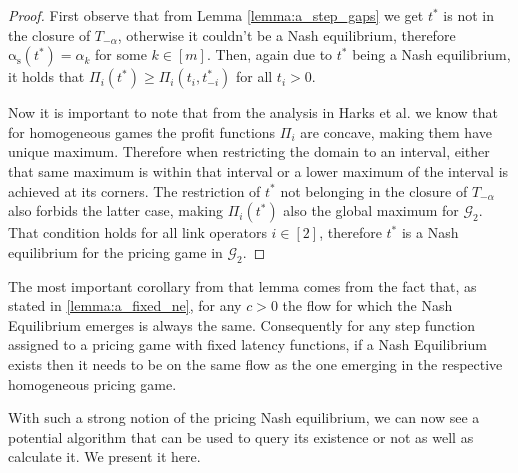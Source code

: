 \documentclass[10pt,a4paper]{book}
\newcommand{\as}{\mathrm{\alpha_s}}
\newcommand{\Gm}{\mathcal{G}}
\theoremstyle{definition}
\theoremstyle{comment}
\begin{document}
\begin{proof}
	First observe that from Lemma \ref{lemma:a_step_gaps} we get $t^*$ is not in the closure of $T_{-\alpha}$, otherwise it couldn't be a Nash equilibrium, therefore $\as(t^*) = \alpha_k$ for some $k \in [m]$.
	Then, again due to $t^*$ being a Nash equilibrium, it holds that $\Pi_i(t^*) \ge \Pi_i(t_i, t_{-i}^*)$ for all $t_i > 0$.

	Now it is important to note that from the analysis in Harks et al. \cite{Harks_2019} we know that for homogeneous games the profit functions $\Pi_i$ are concave, making them have unique maximum.
	Therefore when restricting the domain to an interval, either that same maximum is within that interval or a lower maximum of the interval is achieved at its corners.
	The restriction of $t^*$ not belonging in the closure of $T_{-\alpha}$ also forbids the latter case, making $\Pi_i(t^*)$ also the global maximum for $\Gm_2$.
	That condition holds for all link operators $i \in [2]$, therefore $t^*$ is a Nash equilibrium for the pricing game in $\Gm_2$.
\end{proof}

The most important corollary from that lemma comes from the fact that, as stated in \ref{lemma:a_fixed_ne}, for any $c > 0$ the flow for which the Nash Equilibrium emerges is always the same.
Consequently for any step function assigned to a pricing game with fixed latency functions, if a Nash Equilibrium exists then it needs to be on the same flow as the one emerging in the respective homogeneous pricing game.

With such a strong notion of the pricing Nash equilibrium, we can now see a potential algorithm that can be used to query its existence or not as well as calculate it.
We present it here.
\end{document}
